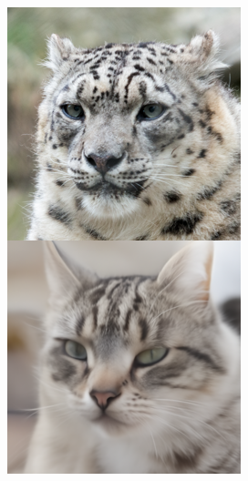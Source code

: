 \documentclass{article}
\begin{document}
\begin{figure}
\begin{minipage}[t]{0.48\textwidth}
\begin{minipage}[t]{0.19\textwidth}
        \end{minipage}
        \begin{minipage}[t]{0.19\textwidth}
            \includegraphics[width=\linewidth]{img/afhq_main/afhq256_bwd_2.png}
        \end{minipage}

\end{minipage}
\end{figure}
\end{document}
